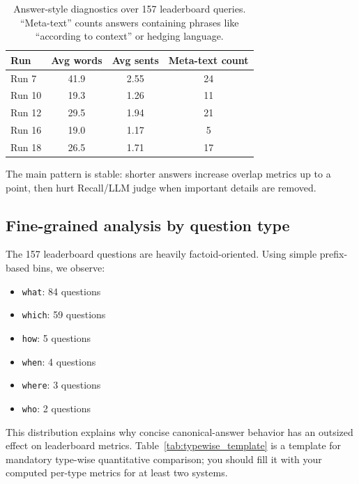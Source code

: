 \documentclass[11pt,twocolumn]{article}
\begin{document}
\begin{table}[t]
\centering
\small
\begin{tabular}{l c c c}
\toprule
\textbf{Run} & \textbf{Avg words} & \textbf{Avg sents} & \textbf{Meta-text count} \\
\midrule
Run 7  & 41.9 & 2.55 & 24 \\
Run 10 & 19.3 & 1.26 & 11 \\
Run 12 & 29.5 & 1.94 & 21 \\
Run 16 & 19.0 & 1.17 & 5 \\
Run 18 & 26.5 & 1.71 & 17 \\
\bottomrule
\end{tabular}
\caption{Answer-style diagnostics over 157 leaderboard queries. ``Meta-text'' counts answers containing phrases like ``according to context'' or hedging language.}
\label{tab:style_diag}
\end{table}

The main pattern is stable: shorter answers increase overlap metrics up to a point, then hurt Recall/LLM judge when important details are removed.

\subsection{Fine-grained analysis by question type}
The 157 leaderboard questions are heavily factoid-oriented. Using simple prefix-based bins, we observe:
\begin{itemize}
    \item \texttt{what}: 84 questions
    \item \texttt{which}: 59 questions
    \item \texttt{how}: 5 questions
    \item \texttt{when}: 4 questions
    \item \texttt{where}: 3 questions
    \item \texttt{who}: 2 questions
\end{itemize}

This distribution explains why concise canonical-answer behavior has an outsized effect on leaderboard metrics. Table~\ref{tab:typewise_template} is a template for mandatory type-wise quantitative comparison; you should fill it with your computed per-type metrics for at least two systems.
\end{document}
